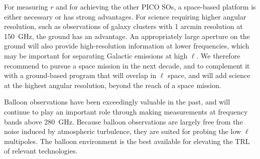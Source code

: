 \documentclass[PICOReport.tex]{subfiles}
\begin{document}
For measuring $r$ and for achieving the other PICO SOs, a space-based platform is either necessary or has strong advantages.  For science requiring higher angular resolution, such as observations of galaxy clusters with 1 arcmin resolution at 150~GHz, the ground has an advantage. An appropriately large aperture on the ground will also provide high-resolution information at lower frequencies, which may be important for separating Galactic emissions at high $\ell$. We therefore recommend to pursue a space mission in the next decade, and to complement it with a ground-based program that will overlap in $\ell$ space, and will add science at the highest angular resolution, beyond the reach of a space mission.


Balloon observations have been exceedingly valuable in the past, and will continue to play an important role through making measurements at frequency bands above 280~GHz. Because balloon observations are largely free from the noise induced by atmospheric turbulence, they are suited for probing the low $\ell$ multipoles. The balloon environment is the best available for elevating the TRL of relevant technologies. 
\end{document}
